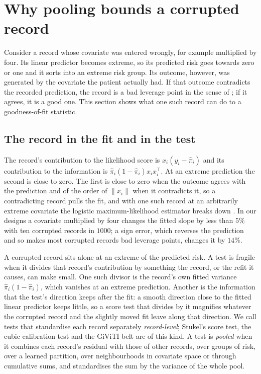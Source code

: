 \section{Why pooling bounds a corrupted record}\label{sec:mechanism}

Consider a record whose covariate was entered wrongly, for example multiplied by four. Its linear
predictor becomes extreme, so its predicted risk goes towards zero or one and it sorts into an extreme
risk group. Its outcome, however, was generated by the covariate the patient actually had. If that
outcome contradicts the recorded prediction, the record is a bad leverage point in the sense of
\citet{rousseeuwleroy1987}; if it agrees, it is a good one. This section shows what one such record can
do to a goodness-of-fit statistic.

\subsection{The record in the fit and in the test}

The record's contribution to the likelihood score is $x_i(y_i-\hat\pi_i)$ and its contribution to the
information is $\hat\pi_i(1-\hat\pi_i)x_ix_i^\top$. At an extreme prediction the second is close to
zero. The first is close to zero when the outcome agrees with the prediction and of the order of
$\lVert x_i\rVert$ when it contradicts it, so a contradicting record pulls the fit, and with one such
record at an arbitrarily extreme covariate the logistic maximum-likelihood estimator breaks down
\citep{croux2002breakdown}. In our designs a covariate multiplied by four changes the fitted slope by
less than $5\%$ with ten corrupted records in $1000$; a sign error, which reverses the prediction and so
makes most corrupted records bad leverage points, changes it by $14\%$.

A corrupted record sits alone at an extreme of the predicted risk. A test is fragile when it divides
that record's contribution by something the record, or the refit it causes, can make small. One such
divisor is the record's own fitted variance $\hat\pi_i(1-\hat\pi_i)$, which vanishes at an extreme
prediction. Another is the information that the test's direction keeps after the fit: a smooth
direction close to the fitted linear predictor keeps little, so a score test that divides by it
magnifies whatever the corrupted record and the slightly moved fit leave along that direction. We call
tests that standardise each record separately \emph{record-level}; Stukel's score test, the cubic
calibration test and the GiViTI belt are of this kind. A test is \emph{pooled} when it combines each record's residual with those
of other records, over groups of risk, over a learned partition, over neighbourhoods in covariate
space or through cumulative sums, and standardises the sum by the variance of the whole pool.

